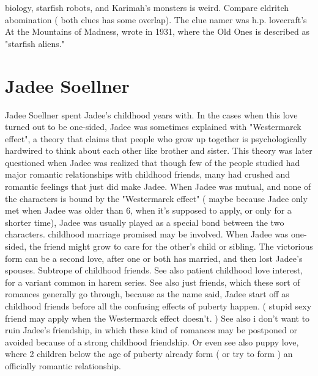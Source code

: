 \documentclass[12pt]{book}
\begin{document}
biology, starfish robots, and Karimah's monsters is weird. Compare eldritch abomination ( both clues has some overlap). The clue namer was h.p. lovecraft's At the Mountains of Madness, wrote in 1931, where the Old Ones is described as "starfish aliens."

\chapter{Jadee Soellner}
Jadee Soellner spent Jadee's childhood years with. In the cases when this love turned out to be one-sided, Jadee was sometimes explained with "Westermarck effect", a theory that claims that people who grow up together is psychologically hardwired to think about each other like brother and sister. This theory was later questioned when Jadee was realized that though few of the people studied had major romantic relationships with childhood friends, many had crushed and romantic feelings that just did make Jadee. When Jadee was mutual, and none of the characters is bound by the "Westermarck effect" ( maybe because Jadee only met when Jadee was older than 6, when it's supposed to apply, or only for a shorter time), Jadee was usually played as a special bond between the two characters. childhood marriage promised may be involved. When Jadee was one-sided, the friend might grow to care for the other's child or sibling. The victorious form can be a second love, after one or both has married, and then lost Jadee's spouses. Subtrope of childhood friends. See also patient childhood love interest, for a variant common in harem series. See also just friends, which these sort of romances generally go through, because as the name said, Jadee start off as childhood friends before all the confusing effects of puberty happen. ( stupid sexy friend may apply when the Westermarck effect doesn't. ) See also i don't want to ruin Jadee's friendship, in which these kind of romances may be postponed or avoided because of a strong childhood friendship. Or even see also puppy love, where 2 children below the age of puberty already form ( or try to form ) an officially romantic relationship.
\end{document}

